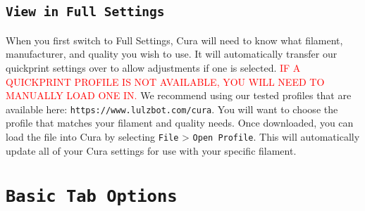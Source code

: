 
\subsection{\texttt{View in Full Settings}}
When you first switch to Full Settings, Cura will need to know what filament, manufacturer, and quality you wish to use. It will automatically transfer our quickprint settings over to allow adjustments if one is selected. \textcolor{red}{IF A QUICKPRINT PROFILE IS NOT AVAILABLE, YOU WILL NEED TO MANUALLY LOAD ONE IN.} We recommend using our tested profiles that are available here: \texttt{https://www.lulzbot.com/cura}. You will want to choose the profile that matches your filament and quality needs. Once downloaded, you can load the file into Cura by selecting \texttt{File} > \texttt{Open Profile}. This will automatically update all of your Cura settings for use with your specific filament.

\section{\texttt{Basic Tab Options}}

